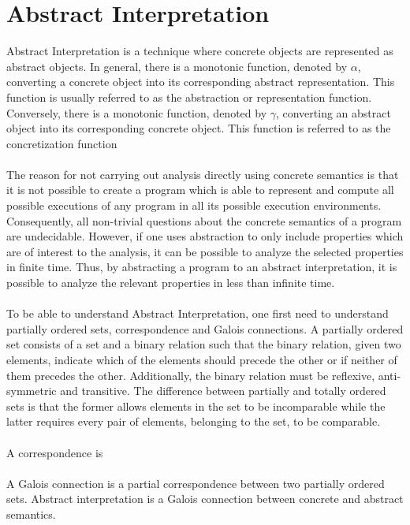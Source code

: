 \documentclass{kththesis}
\begin{document}
\section{Abstract Interpretation}\label{sec:AbsInt}
Abstract Interpretation is a technique where concrete objects are represented as abstract objects. In general, there is a monotonic function, denoted by $\alpha$, converting a concrete object into its corresponding abstract representation. This function is usually referred to as the abstraction or representation function. Conversely, there is a monotonic function, denoted by $\gamma$, converting an abstract object into its corresponding concrete object. This function is referred to as the concretization function
\\ \\%
The reason for not carrying out analysis directly using concrete semantics is that it is not possible to create a program which is able to represent and compute all possible executions of any program in all its possible execution environments\parencite{FRPatrick}. Consequently, all non-trivial questions about the concrete semantics of a program are undecidable. However, if one uses abstraction to only include properties which are of interest to the analysis, it can be possible to analyze the selected properties in finite time. Thus, by abstracting a program to an abstract interpretation, it is possible to analyze the relevant properties in less than infinite time.
\\ \\
To be able to understand Abstract Interpretation, one first need to understand partially ordered sets\parencite{EoMPoset}, correspondence\parencite{EoMCorrespondence} and Galois connections\cite{galoisConnections}. A partially ordered set consists of a set and a binary relation such that the binary relation, given two elements, indicate which of the elements should precede the other or if neither of them precedes the other. Additionally, the binary relation must be reflexive, anti-symmetric and transitive. The difference between partially and totally ordered sets is that the former allows elements in the set to be incomparable while the latter requires every pair of elements, belonging to the set, to be comparable.
\\ \\
A correspondence is
\\ \\
A Galois connection is a partial correspondence between two partially ordered sets. Abstract interpretation is a Galois connection between concrete and abstract semantics.
\end{document}
